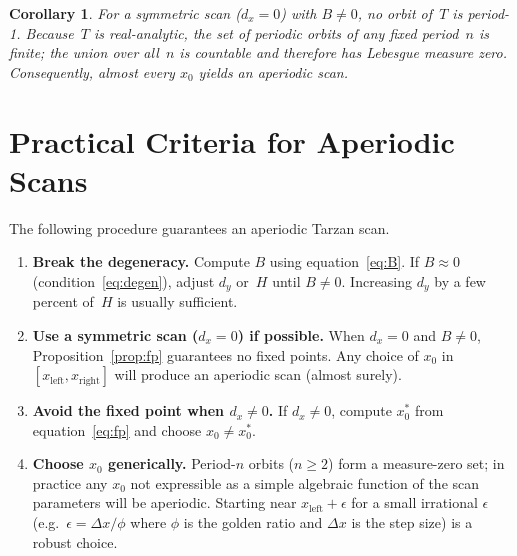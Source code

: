 \documentclass[11pt]{article}
\newtheorem{corollary}{Corollary}[proposition]
\begin{document}
\begin{corollary}
For a symmetric scan ($d_x = 0$) with $B \ne 0$, no orbit of~$T$
is period-1.  Because~$T$ is real-analytic, the set of periodic
orbits of any fixed period~$n$ is finite; the union over all~$n$
is countable and therefore has Lebesgue measure zero.  Consequently,
almost every $x_0$ yields an aperiodic scan.
\end{corollary}

\section{Practical Criteria for Aperiodic Scans}

The following procedure guarantees an aperiodic Tarzan scan.

\begin{enumerate}
  \item \textbf{Break the degeneracy.}
        Compute $B$ using equation~\eqref{eq:B}.
        If $B \approx 0$ (condition~\eqref{eq:degen}), adjust $d_y$
        or~$H$ until $B \ne 0$.  Increasing $d_y$ by a few percent
        of~$H$ is usually sufficient.

  \item \textbf{Use a symmetric scan ($d_x = 0$) if possible.}
        When $d_x = 0$ and $B \ne 0$, Proposition~\ref{prop:fp}
        guarantees no fixed points.  Any choice of $x_0$ in
        $[x_{\mathrm{left}}, x_{\mathrm{right}}]$ will produce an
        aperiodic scan (almost surely).

  \item \textbf{Avoid the fixed point when $d_x \ne 0$.}
        If $d_x \ne 0$, compute $x_0^*$ from
        equation~\eqref{eq:fp} and choose $x_0 \ne x_0^*$.

  \item \textbf{Choose $x_0$ generically.}
        Period-$n$ orbits ($n \ge 2$) form a measure-zero set;
        in practice any $x_0$ not expressible as a simple algebraic
        function of the scan parameters will be aperiodic.
        Starting near $x_{\mathrm{left}} + \epsilon$ for a small
        irrational $\epsilon$ (e.g.\ $\epsilon = \Delta x / \phi$
        where $\phi$ is the golden ratio and $\Delta x$ is the
        step size) is a robust choice.
\end{enumerate}

\end{document}
